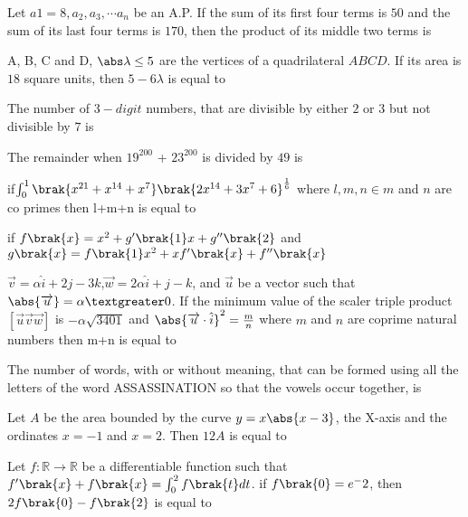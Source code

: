 \iffalse
\title{Assignment 3}
\author{AI24BTECH11018}
\section{integer}
\fi
\item Let $a1 = 8, a_2, a_3,\cdots  a_n$ be an A.P. If the sum of its 
first four terms is $50$ and the sum of its last four 
terms is $170$, then the product of its middle two 
terms is
\hfill{}
\item A, B, C and D, 
$\abs \lambda \leq 5$ are the vertices of a quadrilateral $ABCD$. If 
its area is $18$ square units, then $5-6\lambda$ is equal to
\hfill{}
\item The number of 
$3-digit$ numbers, that are divisible 
by either $2$ or $3$ but not divisible by $7$ is
\hfill{}
\item The remainder when $19^{200}$ + $23^{200}$ is divided by $49$
is 
\hfill{}
\item if$\int_{0}^{1}\brak{x^{21}+x^{14}+x^7}\brak{2x^{14}+3x^{7}+6}^\frac{1}{6}$ where $l,m,n \in m$ and $n$ are co primes then l+m+n is equal to
\hfill{}
\item if $f\brak{x}=x^2+g^{\prime} \brak{1}x+g^{\prime \prime}\brak{2}$ and $g\brak{x}=f\brak{1}x^2+xf^{\prime}\brak{x}+f^{\prime \prime}\brak{x}$
\hfill{}
\item $\overrightarrow{v}=\alpha \hat{i}+2j-3k$,$\overrightarrow{w}=2\alpha \hat{i}+j-k$, and $\overrightarrow{u}$ be a vector such that $\abs {\overrightarrow{u}}=\alpha  \textgreater 0$. If the minimum value of the scaler triple product $[\overrightarrow{u} \overrightarrow{v} \overrightarrow{w}]$ is $-\alpha \sqrt{3401}$ and $\abs {\overrightarrow{u}\cdot \hat{i}}^2=\frac{m}{n}$ where $m$ and $n$ are coprime natural numbers then m+n is equal to
\hfill{}
\item The number of words, with or without meaning, 
that can be formed using all the letters of the word 
ASSASSINATION so that the vowels occur 
together, is
\hfill{}
\item Let $A$ be the area bounded by the curve $y=x\abs {x-3}$, the X-axis and the ordinates $x=-1$ and $x=2$. Then $12A$ is equal to 
\hfill{}
\item Let $f:\mathbb{R} \to \mathbb{R}$ be a differentiable function such that $f^{\prime}\brak{x}+f\brak{x}=\int_{0}^{2}f\brak{t}dt$. if $f\brak{0}=e^-2$, then $2f\brak{0}-f\brak{2}$ is equal to
\hfill{}

%
